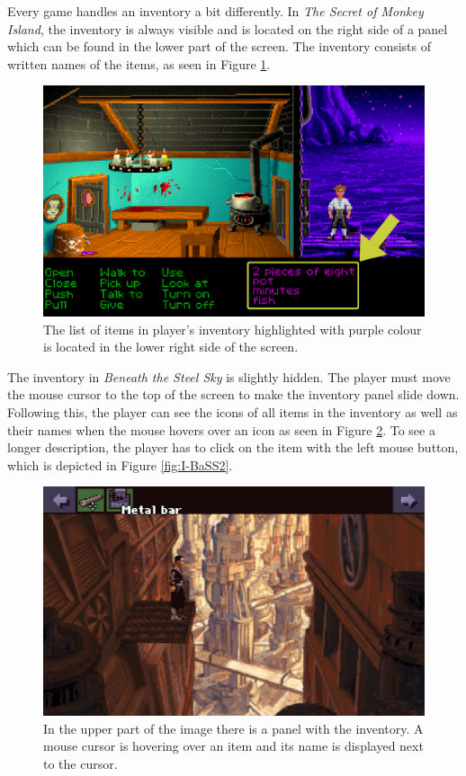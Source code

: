 Every game handles an inventory a bit differently. In \textit{The Secret of Monkey Island}, the inventory is always visible and is located on the right side of a panel which can be found in the lower part of the screen. The inventory consists of written names of the items, as seen in Figure \ref{fig:I-TSoMI}.
\begin{figure}[H]
\centering
\includegraphics[width=.8\linewidth]{img/I-TSoMI.png}
\caption{The list of items in player's inventory highlighted with purple colour is located in the lower right side of the screen.}
\label{fig:I-TSoMI}
\end{figure}

The inventory in \textit{Beneath the Steel Sky} is slightly hidden. The player must move the mouse cursor to the top of the screen to make the inventory panel slide down. Following this, the player can see the icons of all items in the inventory as well as their names when the mouse hovers over an icon as seen in Figure \ref{fig:I-BaSS1}. To see a longer description, the player has to click on the item with the left mouse button, which is depicted in Figure \ref{fig:I-BaSS2}.
\begin{figure}[H]
\centering
\includegraphics[width=1.\linewidth]{img/I-BaSS1.png}
\caption{In the upper part of the image there is a panel with the inventory. A mouse cursor is hovering over an item and its name is displayed next to the cursor.}
\label{fig:I-BaSS1}
\end{figure}

